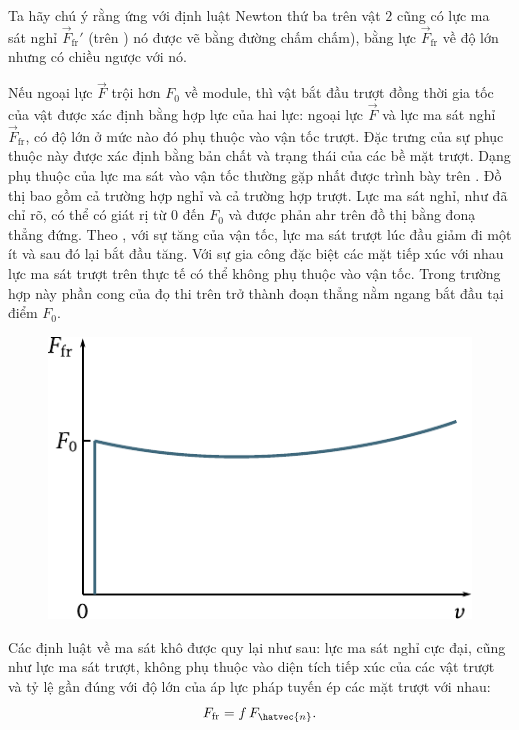 Ta hãy chú ý rằng ứng với định luật Newton thứ ba trên vật $2$ cũng có lực ma sát nghỉ $\vec{F}_{\text{fr}}'$ (trên ) nó được vẽ bằng đường chấm chấm), bằng lực $\vec{F}_{\text{fr}}$ về độ lớn nhưng có chiều ngược với nó.

Nếu ngoại lực $\vec{F}$ trội hơn $F_0$ về module, thì vật bắt đầu trượt đồng thời gia tốc của vật được xác định bằng hợp lực của hai lực: ngoại lực $\vec{F}$ và lực ma sát nghỉ $\vec{F}_{\text{fr}}$, có độ lớn ở mức nào đó phụ thuộc vào vận tốc trượt. Đặc trưng của sự phục thuộc này được xác định bằng bản chất và trạng thái của các bề mặt trượt. Dạng phụ thuộc của lực ma sát vào vận tốc thường gặp nhất được trình bày trên . Đồ thị bao gồm cả trường hợp nghỉ và cả trường hợp trượt. Lực ma sát nghỉ, như đã chỉ rõ, có thể có giát rị từ $0$ đến $F_0$ và được phản ahr trên đồ thị bằng đonạ thẳng đứng. Theo , với sự tăng của vận tốc, lực ma sát trượt lúc đầu giảm đi một ít và sau đó lại bắt đầu tăng.
Với sự gia công đặc biệt các mặt tiếp xúc với nhau lực ma sát trượt trên thực tế có thể không phụ thuộc vào vận tốc. Trong trường hợp này phần cong của đọ thi trên  trở thành đoạn thẳng nằm ngang bắt đầu tại điểm $F_0$.

\begin{figure}[!htb]
	\begin{center}
		\includegraphics[scale=0.98]{figures/ch_02/fig_2_9.pdf}
		\caption[]{}
		\label{fig:2_9}
	\end{center}
\end{figure}

Các định luật về ma sát khô được quy lại như sau: lực ma sát nghỉ cực đại, cũng như lực ma sát trượt, không phụ thuộc vào diện tích tiếp xúc của các vật trượt và tỷ lệ gần đúng với độ lớn của áp lực pháp tuyến ép các mặt trượt với nhau:
\begin{equation}\label{eq:2_35}
F_{\text{fr}} = f\,F_{\hatvec{n}}.
\end{equation}

